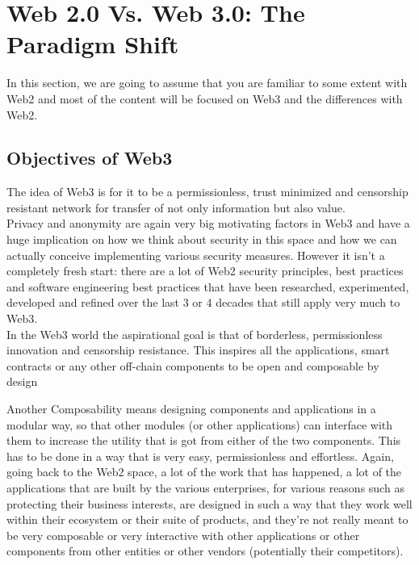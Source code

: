 \section{Web 2.0 Vs. Web 3.0: The Paradigm Shift}

In this section, we are going to assume that you are familiar to some extent with Web2 and most of the content will be focused on Web3 and the differences with Web2.

\subsection*{Objectives of Web3}

The idea of Web3 is for it to be a permissionless, trust minimized and censorship resistant network for transfer of not only information but also value.\\

Privacy and anonymity are again very big motivating factors in Web3 and have a huge implication on how we think about security in this space and how we can actually conceive implementing various security measures.
However it isn't a completely fresh start: there are a lot of Web2 security principles, best practices and software engineering best practices that have been researched, experimented, developed and refined over the last 3 or 4 decades that still apply very much to Web3.\\

In the Web3 world the aspirational goal is that of borderless, permissionless innovation and censorship resistance. This inspires all the applications, smart contracts or any other off-chain components to be open and composable by design

Another 
Composability means designing components and applications in a modular way, so that other modules (or other applications) can interface with them to increase the utility that is got from either of the two components. This has to be done in a way that is very easy, permissionless and effortless. Again, going back to the Web2 space, a lot of the work that has happened, a lot of the applications that are built by the various enterprises, for various reasons such as protecting their business interests, are designed in such a way that they work well within their ecosystem or their suite of products, and they're not really meant to be very composable or very interactive with other applications or other components from other entities or other vendors (potentially their competitors).\\

